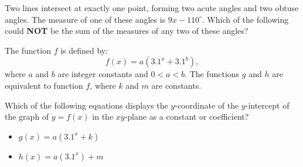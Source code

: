 \noindent\markforreview
\vspace{1em}

Two lines intersect at exactly one point, forming two acute angles and two obtuse angles.
The measure of one of these angles is \(9x - 110^\circ\).
Which of the following could \textbf{NOT} be the sum of the measures of any two of these angles?

\vspace{0.75em}


\vspace{2em}
\newpage

\noindent\markforreview
\vspace{1em}

The function \(f\) is defined by:
\[
f(x) = a(3.1^x + 3.1^b),
\]
where \(a\) and \(b\) are integer constants and \(0 < a < b\).
The functions \(g\) and \(h\) are equivalent to function \(f\), where \(k\) and \(m\) are constants.

Which of the following equations displays the \(y\)-coordinate of the \(y\)-intercept of the graph
of \(y = f(x)\) in the \(xy\)-plane as a constant or coefficient?

\begin{itemize}
\item[I.] \(g(x) = a(3.1^x + k)\)
\item[II.] \(h(x) = a(3.1^x) + m\)
\end{itemize}

\vspace{0.75em}


\vspace{2em}

